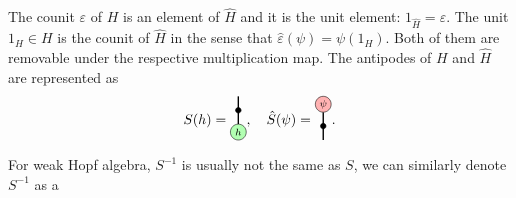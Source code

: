 \documentclass[a4paper,11pt]{article}
\theoremstyle{theorem}
\theoremstyle{remark}
\begin{document}
The counit $\varepsilon$ of $H$ is an element of $\hat{H}$ and it is the unit element: $1_{\hat{H}}=\varepsilon$. The unit $1_H\in H$ is the counit of $\hat{H}$ in the sense that $\hat{\varepsilon}(\psi)=\psi(1_{H})$. Both of them are removable under the respective multiplication map.
The antipodes of $H$ and $\hat{H}$ are represented as 
\begin{equation}
S(h)=
    \begin{aligned}
\begin{tikzpicture}
    \draw[black, line width=1.0pt] (0,0) -- (0,0.7);    
    \filldraw[green!30, draw=black] 
       (0,-0.2) circle (0.2);
    \node at (0, -0.2) {$\scriptstyle h$};
        \filldraw[black] (0, 0.35) circle (2pt);  %
\end{tikzpicture}
\end{aligned}, \quad  \hat{S}(\psi)=
\begin{aligned}
\begin{tikzpicture}
    \draw[black, line width=1.0pt] (0,0) -- (0,0.7); 
      \filldraw[black] (0, 0.35) circle (2pt);  %
    \filldraw[red!30, draw=black] 
      (0,0.9) circle (0.2);
    \node at (0, 0.9) {$\scriptstyle \psi$};
\end{tikzpicture}
\end{aligned}.
\end{equation}
For weak Hopf algebra, $S^{-1}$ is usually not the same as $S$, we can similarly denote $S^{-1}$ as a 
\end{document}
